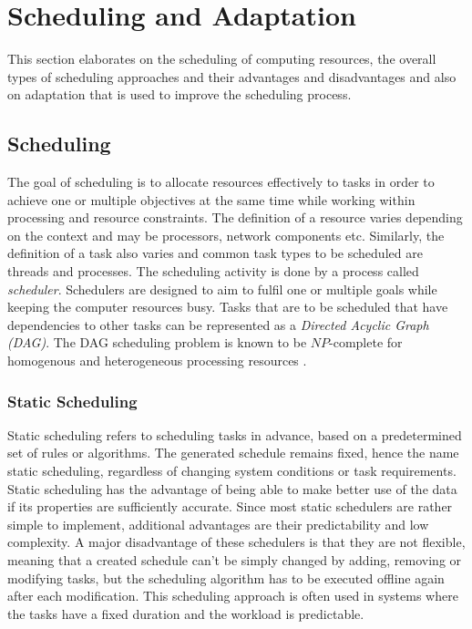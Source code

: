     

    \section{Scheduling and Adaptation}
    \label{sec:scheduling-and-adaptation-background}

        This section elaborates on the scheduling of computing resources, the overall types of scheduling approaches and their advantages and disadvantages and also on adaptation that is used to improve the scheduling process.

        \subsection{Scheduling}
        \label{sec:scheduling-background}


            The goal of scheduling is to allocate resources effectively to tasks in order to achieve one or multiple objectives at the same time while working within processing and resource constraints.
            The definition of a resource varies depending on the context and may be processors, network components etc.
            Similarly, the definition of a task also varies and common task types to be scheduled are threads and processes.
            The scheduling activity is done by a process called \emph{scheduler}.
            Schedulers are designed to aim to fulfil one or multiple goals while keeping the computer resources busy.
            Tasks that are to be scheduled that have dependencies to other tasks can be represented as a \emph{Directed Acyclic Graph (DAG)}.
            The DAG scheduling problem is known to be $NP$-complete for homogenous and heterogeneous processing resources \cite{topcuogluPerformanceeffectiveLowcomplexityTask2002}.


            \subsubsection{Static Scheduling}
            \label{sec:static-scheduling-background}

                Static scheduling refers to scheduling tasks in advance, based on a predetermined set of rules or algorithms.
                The generated schedule remains fixed, hence the name static scheduling, regardless of changing system conditions or task requirements.
                Static scheduling has the advantage of being able to make better use of the data if its properties are sufficiently accurate.
                Since most static schedulers are rather simple to implement, additional advantages are their predictability and low complexity.
                A major disadvantage of these schedulers is that they are not flexible, meaning that a created schedule can't be simply changed by adding, removing or modifying tasks, but the scheduling algorithm has to be executed offline again after each modification.
                This scheduling approach is often used in systems where the tasks have a fixed duration and the workload is predictable.


